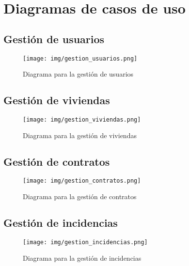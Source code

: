 \chapter{Diagramas de casos de uso}
\section{Gestión de usuarios}

\begin{figure}[!h]
  \centering
    \texttt{[image: img/gestion\_usuarios.png]}
    \caption{Diagrama para la gestión de usuarios}
\end{figure}
\pagebreak

\section{Gestión de viviendas}

\begin{figure}[!h]
  \centering
    \texttt{[image: img/gestion\_viviendas.png]}
    \caption{Diagrama para la gestión de viviendas}
\end{figure}
\pagebreak

\section{Gestión de contratos}

\begin{figure}[!h]
  \centering
    \texttt{[image: img/gestion\_contratos.png]}
    \caption{Diagrama para la gestión de contratos}
\end{figure}

\section{Gestión de incidencias}

\begin{figure}[!h]
  \centering
    \texttt{[image: img/gestion\_incidencias.png]}
    \caption{Diagrama para la gestión de incidencias}
\end{figure}